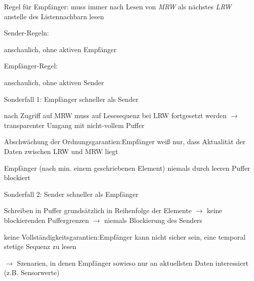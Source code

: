 \documentclass[a4paper]{article}
\begin{document}
\begin{multicols}{3}
\begin{itemize*}
\begin{itemize*}
            \item Regel für Empfänger: muss immer nach Lesen von \emph{MRW} als nächstes \emph{LRW} anstelle des Listennachbarn lesen
        \end{itemize*}
        \item Sender-Regeln:
        \begin{itemize*}
            \item anschaulich, ohne aktiven Empfänger
        \end{itemize*}
        \item Empfänger-Regel:
        \begin{itemize*}
            \item anschaulich, ohne aktiven Sender
        \end{itemize*}
    \end{itemize*}

    Sonderfall 1: Empfänger schneller als Sender

    \begin{itemize*}
        \item nach Zugriff auf MRW muss auf Lesesequenz bei LRW fortgesetzt werden
        $\rightarrow$ transparenter Umgang mit nicht-vollem
        Puffer
        \item Abschwächung der Ordnungsgarantien:Empfänger weiß nur, dass Aktualität
        der Daten zwischen LRW und MRW liegt
        \item Empfänger (nach min. einem geschriebenen Element) niemals durch leeren
        Puffer blockiert
    \end{itemize*}

    Sonderfall 2: Sender schneller als Empfänger

    \begin{itemize*}
        \item Schreiben in Puffer grundsätzlich in Reihenfolge der Elemente
        $\rightarrow$ keine blockierenden Puffergrenzen
        $\rightarrow$ niemals Blockierung des Senders
        \item keine Vollständigkeitsgarantien:Empfänger kann nicht sicher sein, eine
        temporal stetige Sequenz zu lesen
        \item $\rightarrow$ Szenarien, in denen Empfänger sowieso
        nur an aktuellsten Daten interessiert (z.B. Sensorwerte)
    \end{itemize*}


\end{multicols}
\end{document}
